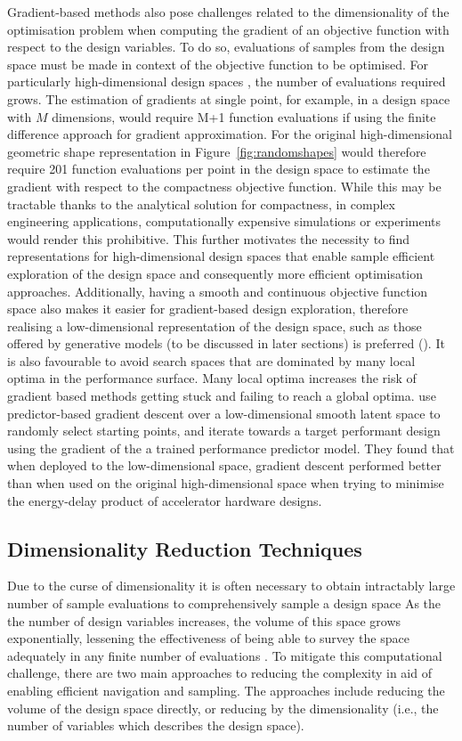 \documentclass{article}
\begin{document}
Gradient-based methods also pose challenges related to the dimensionality of the optimisation problem when computing the gradient of an objective function with respect to the design variables. To do so, evaluations of samples from the design space must be made in context of the objective function to be optimised. For particularly high-dimensional design spaces \citep{Serani2024}, the number of evaluations required grows. The estimation of gradients at single point, for example, in a design space with $M$ dimensions, would require M+1 function evaluations if using the finite difference approach for gradient approximation. For the original high-dimensional geometric shape representation in Figure~\ref{fig:randomshapes} would therefore require 201 function evaluations per point in the design space to estimate the gradient with respect to the compactness objective function. While this may be tractable thanks to the analytical solution for compactness, in complex engineering applications, computationally expensive simulations or experiments would render this prohibitive. This further motivates the necessity to find representations for high-dimensional design spaces that enable  sample efficient exploration of the design space and consequently more efficient optimisation approaches. Additionally, having a smooth and continuous objective function space also makes it easier for gradient-based design exploration, therefore realising a low-dimensional representation of the design space, such as those offered by generative models (to be discussed in later sections) is preferred (\cite{bottou2010large}). It is also favourable to avoid search spaces that are dominated by many  local optima in the performance surface. Many local optima increases the risk of gradient based methods getting stuck and failing to reach a global optima. \citep{Huang2022} use predictor-based gradient descent over a low-dimensional smooth latent space to randomly select starting points, and iterate towards a target performant design using the gradient of the a trained performance predictor model. They found that when deployed to the low-dimensional space, gradient descent performed better than when used on the original high-dimensional space when trying to minimise the energy-delay product of accelerator hardware designs.

\subsection{Dimensionality Reduction Techniques}
Due to the curse of dimensionality it is often necessary to obtain intractably large number of sample evaluations to comprehensively sample a design space As the the number of design variables increases, the volume of this space grows exponentially, lessening the effectiveness of being able to survey the space adequately in any finite number of evaluations \citep{Serani2024}. To mitigate this computational challenge, there are two main approaches to reducing the complexity in aid of enabling efficient navigation and sampling. The approaches include reducing the volume of the design space directly, or reducing by the dimensionality (i.e., the number of variables which describes the design space). 
\end{document}
